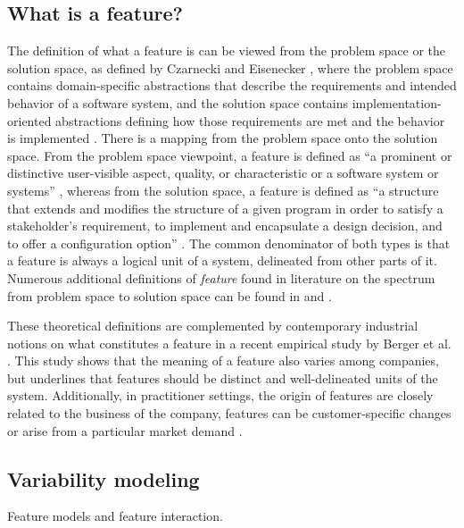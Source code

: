 \subsection{What is a feature?}
The definition of what a feature is can be viewed from the problem space or the solution space, as defined by Czarnecki and Eisenecker \cite{czarnecki2000generative}, where the problem space contains domain-specific abstractions that describe the requirements  and intended behavior of a software system, and the solution space contains implementation-oriented abstractions defining how those requirements are met and the behavior is implemented \cite{apel2009overview}. There is a mapping from the problem space onto the solution space. From the problem space viewpoint, a feature is defined as ``a prominent or distinctive user-visible aspect, quality, or characteristic or a software system or systems'' \cite{kang1990feature}, whereas from the solution space, a feature is defined as ``a structure that extends and modifies the structure of a given program in order to satisfy a stakeholder's requirement, to implement and encapsulate a design decision, and to offer a configuration option'' \cite{apel2008algebra}.
The common denominator of both types is that a feature is always a logical unit of a system, delineated from other parts of it. Numerous additional definitions of \textit{feature} found in literature on the spectrum from problem space to solution space can be found in \cite{apel2009overview} and \cite{berger2015feature}.

These theoretical definitions are complemented by contemporary industrial notions on what constitutes a feature in a recent empirical study by Berger et al. \cite{berger2015feature}. This study shows that the meaning of a feature also varies among companies, but underlines that features should be distinct and well-delineated units of the system. Additionally, in practitioner settings, the origin of features are closely related to the business of the company, features can be customer-specific changes or arise from a particular market demand \cite{berger2015feature}.

\subsection{Variability modeling}
Feature models and feature interaction.

